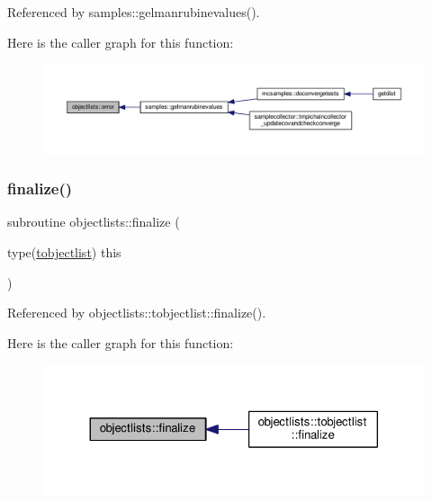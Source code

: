 Referenced by samples\+::gelmanrubinevalues().

Here is the caller graph for this function\+:
\nopagebreak
\begin{figure}[H]
\begin{center}
\leavevmode
\includegraphics[width=350pt]{namespaceobjectlists_a36abcb049579dcfaee4f3d38cf09b5d1_icgraph}
\end{center}
\end{figure}
\mbox{\label{namespaceobjectlists_ad1d73743c5898bdaac2a79a9ade2342c}} 
\subsubsection{\texorpdfstring{finalize()}{finalize()}}
{\footnotesize\ttfamily subroutine objectlists\+::finalize (\begin{DoxyParamCaption}\item[{type(\mbox{\hyperlink{structobjectlists_1_1tobjectlist}{tobjectlist}})}]{this }\end{DoxyParamCaption})\hspace{0.3cm}{\ttfamily [private]}}



Referenced by objectlists\+::tobjectlist\+::finalize().

Here is the caller graph for this function\+:
\nopagebreak
\begin{figure}[H]
\begin{center}
\leavevmode
\includegraphics[width=324pt]{namespaceobjectlists_ad1d73743c5898bdaac2a79a9ade2342c_icgraph}
\end{center}
\end{figure}
\mbox{\label{namespaceobjectlists_a180e000881c5eca28ea4c77daec5d47b}} 
